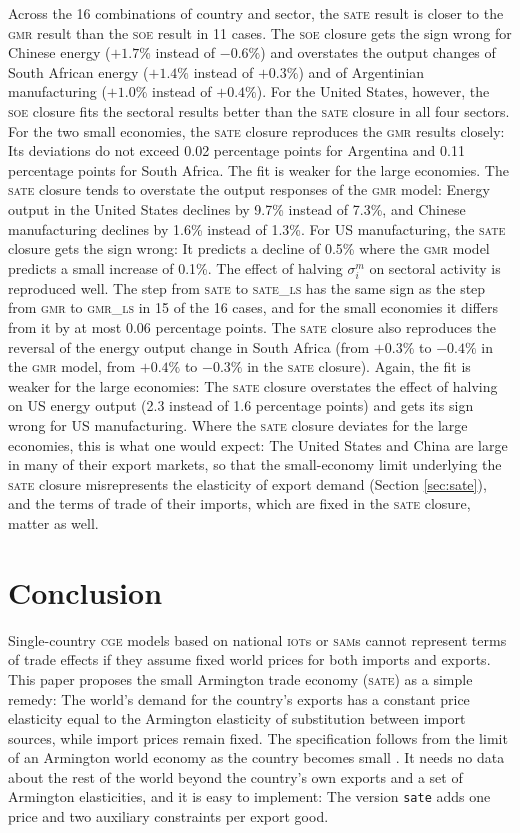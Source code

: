 \documentclass{jgea}
\newcommand{\CGE}{\textsc{cge}\xspace}
\newcommand{\SOE}{\textsc{soe}\xspace}
\newcommand{\SATE}{\textsc{sate}\xspace}
\newcommand{\GMR}{\textsc{gmr}\xspace}
\newcommand{\GMRLS}{\textsc{gmr\_ls}\xspace}
\newcommand{\SATELS}{\textsc{sate\_ls}\xspace}
\newcommand{\IOT}{\textsc{iot}\xspace}
\newcommand{\SAM}{\textsc{sam}\xspace}
\begin{document}
Across the 16 combinations of country and sector, the \SATE result is closer to the \GMR result than the \SOE result in 11 cases.
The \SOE closure gets the sign wrong for Chinese energy ($+1.7\%$ instead of $-0.6\%$) and overstates the output changes of South African energy ($+1.4\%$ instead of $+0.3\%$) and of Argentinian manufacturing ($+1.0\%$ instead of $+0.4\%$).
For the United States, however, the \SOE closure fits the sectoral results better than the \SATE closure in all four sectors.
For the two small economies, the \SATE closure reproduces the \GMR results closely:
Its deviations do not exceed 0.02 percentage points for Argentina and 0.11 percentage points for South Africa.
The fit is weaker for the large economies.
The \SATE closure tends to overstate the output responses of the \GMR model:
Energy output in the United States declines by 9.7\% instead of 7.3\%, and Chinese manufacturing declines by 1.6\% instead of 1.3\%.
For US manufacturing, the \SATE closure gets the sign wrong:
It predicts a decline of 0.5\% where the \GMR model predicts a small increase of 0.1\%.
The effect of halving $\sigma^m_i$ on sectoral activity is reproduced well.
The step from \SATE to \SATELS has the same sign as the step from \GMR to \GMRLS in 15 of the 16 cases, and for the small economies it differs from it by at most 0.06 percentage points.
The \SATE closure also reproduces the reversal of the energy output change in South Africa (from $+0.3\%$ to $-0.4\%$ in the \GMR model, from $+0.4\%$ to $-0.3\%$ in the \SATE closure).
Again, the fit is weaker for the large economies:
The \SATE closure overstates the effect of halving on US energy output (2.3 instead of 1.6 percentage points) and gets its sign wrong for US manufacturing.
Where the \SATE closure deviates for the large economies, this is what one would expect:
The United States and China are large in many of their export markets, so that the small-economy limit underlying the \SATE closure misrepresents the elasticity of export demand (Section \ref{sec:sate}), and the terms of trade of their imports, which are fixed in the \SATE closure, matter as well.

\section{Conclusion}\label{sec:concl}

Single-country \CGE models based on national \IOT{}s or \SAM{}s cannot represent terms of trade effects if they assume fixed world prices for both imports and exports.
This paper proposes the small Armington trade economy (\SATE) as a simple remedy:
The world's demand for the country's exports has a constant price elasticity equal to the Armington elasticity of substitution between import sources, while import prices remain fixed.
The specification follows from the limit of an Armington world economy as the country becomes small \citep{CaliendoFeenstra2024}.
It needs no data about the rest of the world beyond the country's own exports and a set of Armington elasticities, and it is easy to implement:
The version \texttt{sate} adds one price and two auxiliary constraints per export good.
\end{document}
